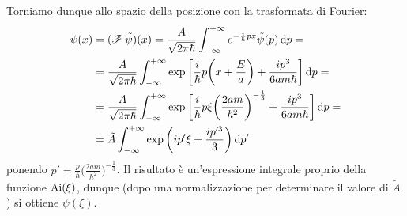 Torniamo dunque allo spazio della posizione con la trasformata di Fourier:
\begin{equation}
	\begin{split}
		\psi(x)&=(\operatorname{\mathscr{F}}{\tilde{\psi}})(x)=\frac{A}{\sqrt{2\pi\hbar}}\int_{-\infty}^{+\infty}e^{-\frac{i}{\hbar}px}\tilde{\psi}(p)\,\textup{d} p=\\
		&=\frac{A}{\sqrt{2\pi\hbar}}\int_{-\infty}^{+\infty}\exp\bigg[\frac{i}{\hbar}p\bigg(x+\frac{E}{a}\bigg)+\frac{ip^3}{6am\hbar}\bigg]\,\textup{d} p=\\
		&=\frac{A}{\sqrt{2\pi\hbar}}\int_{-\infty}^{+\infty}\exp\bigg[\frac{i}{\hbar}p\xi\bigg(\frac{2am}{\hbar^2}\bigg)^{-\frac13}+\frac{ip^3}{6am\hbar}\bigg]\,\textup{d} p=\\ &=\tilde{A}\int_{-\infty}^{+\infty}\exp\bigg(ip'\xi+\frac{ip'^3}3\bigg)\,\textup{d} p'
	\end{split}
\end{equation}
ponendo $p'=\frac{p}{\hbar}\big(\frac{2am}{\hbar^2}\big)^{-\frac13}$.
Il risultato è un'espressione integrale proprio della funzione $\operatorname{Ai}(\xi)$, dunque (dopo una normalizzazione per determinare il valore di $\tilde{A}$) si ottiene $\psi(\xi)$.

